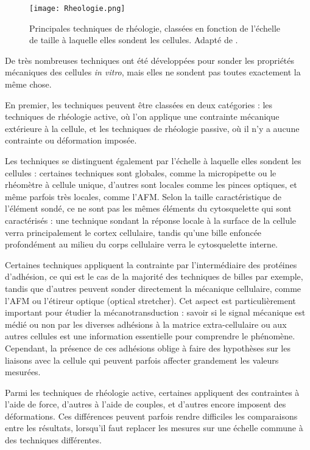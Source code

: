 \begin{figure}
\texttt{[image: Rheologie.png]}
\caption{Principales techniques de rhéologie, classées en fonction de l'échelle de taille à laquelle elles sondent les cellules. Adapté de \cite{huber_emergent_2013}.}
\end{figure}

De très nombreuses techniques ont été développées pour sonder les propriétés mécaniques des cellules \textit{in vitro}, mais elles ne sondent pas toutes exactement la même chose. 


En premier, les techniques peuvent être classées en deux catégories : les techniques de rhéologie active, où l'on applique une contrainte mécanique extérieure à la cellule, et les techniques de rhéologie passive, où il n'y a aucune contrainte ou déformation imposée. 

Les techniques se distinguent également par l'échelle à laquelle elles sondent les cellules : certaines techniques sont globales, comme la micropipette ou le rhéomètre à cellule unique, d'autres sont locales comme les pinces optiques, et même parfois très locales, comme l'AFM. 
Selon la taille caractéristique de l'élément sondé, ce ne sont pas les mêmes éléments du cytosquelette qui sont caractérisés : une technique sondant la réponse locale à la surface de la cellule verra principalement le cortex cellulaire, tandis qu'une bille enfoncée profondément au milieu du corps cellulaire verra le cytosquelette interne. 

Certaines techniques appliquent la contrainte par l'intermédiaire des protéines d'adhésion, ce qui est le cas de la majorité des techniques de billes par exemple, tandis que d'autres peuvent sonder directement la mécanique cellulaire, comme l'AFM ou l'étireur optique (optical stretcher). Cet aspect est particulièrement important pour étudier la mécanotransduction : savoir si le signal mécanique est médié ou non par les diverses adhésions à la matrice extra-cellulaire ou aux autres cellules est une information essentielle pour comprendre le phénomène. 
Cependant, la présence de ces adhésions oblige à faire des hypothèses sur les liaisons avec la cellule qui peuvent parfois affecter grandement les valeurs mesurées. 

Parmi les techniques de rhéologie active, certaines appliquent des contraintes à l'aide de force, d'autres à l'aide de couples, et d'autres encore imposent des déformations. Ces différences peuvent parfois rendre difficiles les comparaisons entre les résultats, lorsqu'il faut replacer les mesures sur une échelle commune à des techniques différentes. 

